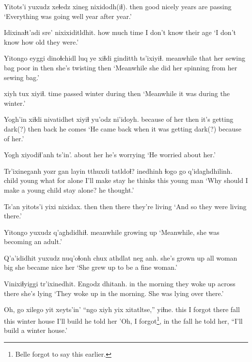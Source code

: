 \documentclass[12pt]{article}
\begin{document}
\gll Yitots'i yuxudz xeɬedz xineg  nixidodh(iɬ).
then  {}   good   nicely {years are passing}
\glt `Everything was going well year after year.'
\glend

\gll Idixinaɬt'adi sre'         nixixiditldhit.
{how much time}     {I don't know} {their age}
\glt `I don't know how old they were.'
\glend

\gll Yitongo   eyggi dinoɬchidl   luq  ye xiɬdi ginditth ts'ixiyiɬ.
meanwhile that  {her sewing bag} poor in then {she's twisting} then
\glt `Meanwhile she did her spinning from her sewing bag.'
\glend

 xiyh   tux    xiyiɬ.
{time passed} winter during then
\glt `Meanwhile it was during the winter.'
\glend

\gll Yogh'in       xiɬdi nivatidhet    xiyiɬ  yu'odz ni'idoyh.
{because of her} then   {it's getting dark(?)} then back {he comes}
\glt `He came back when it was getting dark(?) because of her.'
\glend

\gll Yogh      xiyodiɬ'anh ts'in'.
{about her} {he's worrying}
\glt `He worried about her.'
\glend

\gll Tr'ixineganh yozr  gan  layin tthuxdi tatldoɬ?        inedhinh ɬogo go   q'idaghdhilinh.
child        young what for alone   {I'll make stay} {he thinks} {}  this {young man}
\glt `Why should I make a young child stay alone? he thought.'
\glend

\gll Ts'an yitots'i yixi  nixidax.
then  then    there {they're living}
\glt `And so they were living there.'
\glend

\gll Yitongo   yuxudz q'aghdidhiɬ.
meanwhile {}       {growing up  }
\glt `Meanwhile, she was becoming an adult.'
\glend

\gll Q'a'ididhit    yuxudz nuq'oɬonh chux athdlat neg anh.
{she's grown up} all   woman     big  {she became} nice her
\glt `She grew up to be a fine woman.'
\glend

\gll Vinixiɬyiggi    tr'ixinedhit. Engodz       dhitanh.
{in the morning} {they woke up}  {across there} {she's lying}
\glt `They woke up in the morning. She was lying over there.'
\glend

\gll Oh, go {xilego}  yit   xeyts'in' ``ngo xiyh yix     xitatltse,''  yiɬne. 
{} this {I forgot}  there fall      this winter house {I'll build} {he told her}
\glt 'Oh, I forgot\footnote{Belle forgot to say this earlier.}, in the fall he told her, ``I'll build a winter house.'
\glend
\end{document}
